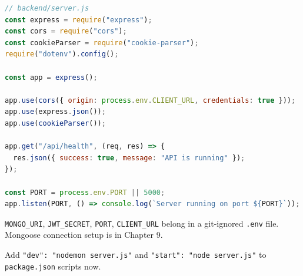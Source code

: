 \begin{lstlisting}[language=JavaScript]
// backend/server.js
const express = require("express");
const cors = require("cors");
const cookieParser = require("cookie-parser");
require("dotenv").config();

const app = express();

app.use(cors({ origin: process.env.CLIENT_URL, credentials: true }));
app.use(express.json());
app.use(cookieParser());

app.get("/api/health", (req, res) => {
  res.json({ success: true, message: "API is running" });
});

const PORT = process.env.PORT || 5000;
app.listen(PORT, () => console.log(`Server running on port ${PORT}`));
\end{lstlisting}

\begin{notebox}[NOTE]
\texttt{MONGO\_URI}, \texttt{JWT\_SECRET}, \texttt{PORT}, \texttt{CLIENT\_URL} belong in a
git-ignored \texttt{.env} file. Mongoose connection setup is in Chapter 9.
\end{notebox}

\begin{tipbox}[TIP]
Add \texttt{"dev": "nodemon server.js"} and \texttt{"start": "node server.js"} to
\texttt{package.json} scripts now.
\end{tipbox}

